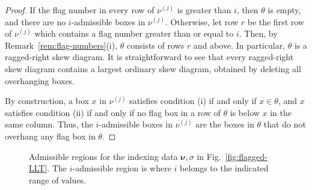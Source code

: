 \documentclass[12pt]{amsart}
\theoremstyle{definition}
\theoremstyle{remark}
\newcommand{\nubold}{{\boldsymbol \nu }}
\newcommand{\flagwave}[1]{\vphantom{1}^{\#}\!\mathsf{#1}}
\begin{document}
\begin{proof}
If the flag number in every row of $\nu ^{(j)}$ is greater than $i$,
then $\theta $ is empty, and there are no $i$-admissible boxes in $\nu
^{(j)}$.  Otherwise, let row $r$ be the first row of $\nu ^{(j)}$
which contains a flag number greater than or equal to $i$.  Then, by
Remark~\ref{rem:flag-numbers}(i), $\theta $ consists of rows $r$ and
above.  In particular, $\theta $ is a ragged-right skew diagram.  It
is straightforward to see that every ragged-right skew diagram
contains a largest ordinary skew diagram, obtained by deleting all
overhanging boxes.

By construction, a box $x$ in $\nu ^{(j)}$ satisfies condition (i) if
and only if $x\in \theta $, and $x$ satisfies condition (ii) if and
only if no flag box in a row of $\theta $ is below $x$ in the same
column.  Thus, the $i$-admissible boxes in $\nu ^{(j)}$ are the boxes
in $\theta $ that do not overhang any flag box in $\theta $.
\end{proof}


\begin{figure}
\caption{\label{fig:flagged-LLT-2}Admissible regions for the indexing
data $\nubold , \sigma $ in Fig.~\ref{fig:flagged-LLT}.  The
$i$-admissible region is where $i$ belongs to the indicated range of
values.}
\end{figure}
\end{document}
